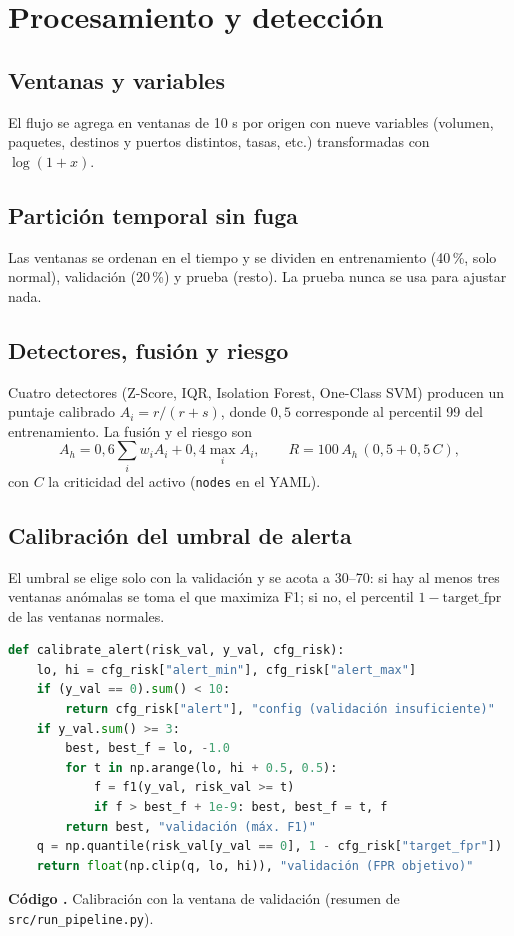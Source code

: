 \documentclass[conference,onecolumn]{IEEEtran}
\newcommand{\cmd}[1]{\texttt{#1}}
\newcounter{codigo}
\newcommand{\codigo}[2]{\par\refstepcounter{codigo}\label{#2}{\footnotesize\textbf{Código \thecodigo.} #1}\par\nopagebreak}
\begin{document}
\section{Procesamiento y detección}
\subsection{Ventanas y variables}
El flujo se agrega en ventanas de 10 s por origen con nueve variables (volumen, paquetes, destinos y puertos distintos, tasas, etc.) transformadas con $\log(1+x)$.

\subsection{Partición temporal sin fuga}
Las ventanas se ordenan en el tiempo y se dividen en entrenamiento (40\,\%, solo normal), validación (20\,\%) y prueba (resto). La prueba nunca se usa para ajustar nada.

\subsection{Detectores, fusión y riesgo}
Cuatro detectores (Z-Score, IQR, Isolation Forest, One-Class SVM) producen un puntaje calibrado $A_i=r/(r+s)$, donde $0{,}5$ corresponde al percentil 99 del entrenamiento. La fusión y el riesgo son
\begin{equation}
A_h = 0{,}6\sum_i w_iA_i + 0{,}4\max_i A_i,\qquad R = 100\,A_h\,(0{,}5+0{,}5\,C),
\end{equation}
con $C$ la criticidad del activo (\cmd{nodes} en el YAML).

\subsection{Calibración del umbral de alerta}
El umbral se elige solo con la validación y se acota a 30--70: si hay al menos tres ventanas anómalas se toma el que maximiza F1; si no, el percentil $1-\text{target\_fpr}$ de las ventanas normales.
\begin{lstlisting}[language=Python]
def calibrate_alert(risk_val, y_val, cfg_risk):
    lo, hi = cfg_risk["alert_min"], cfg_risk["alert_max"]
    if (y_val == 0).sum() < 10:
        return cfg_risk["alert"], "config (validación insuficiente)"
    if y_val.sum() >= 3:
        best, best_f = lo, -1.0
        for t in np.arange(lo, hi + 0.5, 0.5):
            f = f1(y_val, risk_val >= t)
            if f > best_f + 1e-9: best, best_f = t, f
        return best, "validación (máx. F1)"
    q = np.quantile(risk_val[y_val == 0], 1 - cfg_risk["target_fpr"])
    return float(np.clip(q, lo, hi)), "validación (FPR objetivo)"
\end{lstlisting}
\codigo{Calibración con la ventana de validación (resumen de \cmd{src/run\_pipeline.py}).}{cod:calib}
\end{document}
